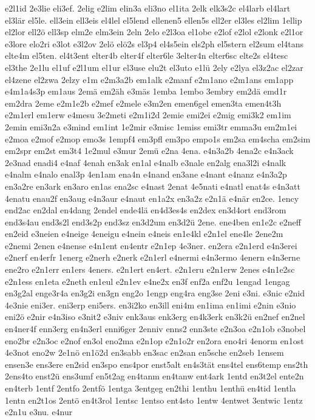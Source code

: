 {e2l1id
2e3lie
eli3ef.
2elig
e2lim
elin3a
eli3no
el1ita
2elk
elk3s2c
el4larb
el4lart
el3lär
el5le.
ell3ein
ell3eis
el4lel
el5lend
ellenen5
ellen5s
ell2er
el3les
el2lim
1ellip
el2lor
ell2ö
ell3sp
elm2e
elm3ein
2eln
2elo
e2l3oa
el1obe
e2lof
e2lol
e2lonk
e2l1or
e3lore
elo2ri
e3lot
e3l2ov
2elö
elö2s
el3p4
el4s5ein
els2ph
el5stern
el2sum
el4tans
elte4m
el5ten.
el4t3ent
elter4b
elter4f
elter6le
3elter4n
elter6sc
elte2s
el4tesc
el3the
2e1lu
el1uf
e2l1um
el1ur
el3use
elu2t
el3uto
e1lü
2ely
e2lya
el3z2ac
el2zar
el4zene
el2zwa
2elzy
e1m
e2m3a2b
em1alk
e2manf
e2m1ano
e2m1ans
em1app
e4m1a4s3p
em1aus
2emä
em2äh
e3mäs
1emba
1embo
3embry
em2dä
emd1r
em2dra
2eme
e2m1e2b
e2mef
e2mele
e3m2en
emen6gel
emen3ta
emen4t3h
e2m1erl
em1erw
e4mesu
3e2meti
e2m1i2d
2emie
emi2ei
e2mig
emi3k2
em1im
2emin
emi3n2a
e3mind
em1int
1e2mir
e3misc
1emiss
emi3tr
emma3u
em2m1ei
e2moa
e2mof
e2mop
emo3s
1empf4
em3pfl
em3po
empo1s
em2sa
em4scha
em2sim
em2spr
em2st
em3t4
1e2mul
e3mur
2emü
e2na
4ena.
e4n3a2b
4ena2c
e4n3ack
2e3nad
enadi4
e4naf
4enah
en3ak
en1al
e4nalb
e3nale
en2alg
ena3l2i
e4nalk
e4nalm
e4nalo
enal3p
4en1am
ena4n
e4nand
en3ane
e4nant
e4nanz
e4n3a2p
en3a2re
en3ark
en3aro
en1as
ena2sc
e4nast
2enat
4e5nati
e4natl
enat4s
e4n3att
4enatu
enau2f
en3aug
e4n3aur
e4naut
en1a2x
en3a2z
e2n1ä
e4när
en2ce.
1ency
end2ac
en2dal
en4dang
2endel
ende4lä
en4d3es4s
en2dex
en3d4ort
end3rom
end3s4au
end3s2l
end3s2p
end3sz
en3d2um
en3d2ü
2ene.
ene4ben
en1e2c
e2neff
en2eid
e3neien
e4neige
4eneigu
e4nein
e4neis
en1e4kl
e2n1el
ene4le
2ene2m
e2nemi
2enen
e4nense
e4n1ent
en4entr
e2n1ep
4e3ner.
en2era
e2n1erd
e4n3erei
e2nerf
en4erfr
1energ
e2nerh
e2nerk
e2n1erl
e4nermi
e4n3ermo
4enern
e4n3erne
ene2ro
e2n1err
en1ers
4eners.
e2n1ert
en4ert.
e2n1eru
e2n1erw
2enes
e4n1e2sc
e2n1ess
en1eta
e2neth
en1eul
e2n1ev
e4ne2x
en3f
enf2a
enf2u
1engad
1engag
en3g2al
enge3r4a
en3g2i
en3gn
eng2o
1engp
eng4ra
eng3se
2eni
e3ni.
e3nic
e2nid
4e3nie
eni3er.
eni3erp
eni5ers.
en3i2ko
en3ill
eni4m
en1ima
en1imi
e2nin
e3nio
eni2ö
e2nir
e4n3iso
e3nit2
e3niv
enk3aus
enk3erg
en4k3erk
en3k2ü
en2nef
en2nel
en4ner4f
enn3erg
en4n3erl
enni6ger
2enniv
enns2
enn3ste
e2n3oa
e2n1ob
e3nobel
eno2br
e2n3oc
e2nof
en3ol
eno2ma
e2n1op
e2n1o2r
en2ora
eno4ri
4enorm
en1ost
4e3not
eno2w
2e1nö
en1ö2d
en3sabb
en3sac
en2san
en5sche
en2seb
1ensem
ensen3e
ens3ere
en2sid
en3spo
ens4por
enst5alt
en4s3tät
ens4tel
ens6temp
ens2th
2ens4to
enst2ü
ens3umf
en5t2ag
en4tanm
en4tanw
ent4ark
1entd
en3t2el
ente2n
en4terb
1entf
2entfo
2entfö
1entga
3entgeg
en2thi
1enthu
1enthü
en4tid
1entla
1entn
en2t1os
2entö
en4t3rol
1entsc
1entso
ent4sto
1entw
4entwet
3entwic
1entz
e2n1u
e3nu.
e4nur
}
